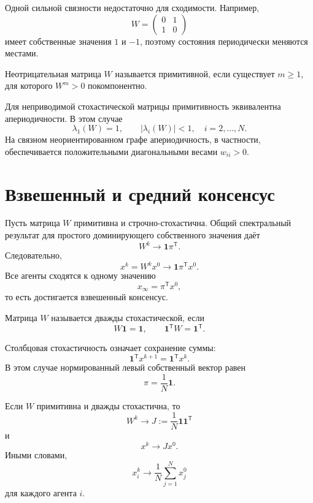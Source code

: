 Одной сильной связности недостаточно для сходимости. Например,
\[
    W=
    \begin{pmatrix}
        0&1\\
        1&0
    \end{pmatrix}
\]
имеет собственные значения \(1\) и \(-1\), поэтому состояния
периодически меняются местами.

\begin{definition}[Примитивность]
Неотрицательная матрица \(W\) называется примитивной, если существует
\(m\ge1\), для которого \(W^m>0\) покомпонентно.
\end{definition}

Для неприводимой стохастической матрицы примитивность эквивалентна
апериодичности. В этом случае
\[
    \lambda_1(W)=1,
    \qquad
    |\lambda_i(W)|<1,
    \quad i=2,\ldots,N.
\]
На связном неориентированном графе апериодичность, в частности,
обеспечивается положительными диагональными весами \(w_{ii}>0\).

\section{Взвешенный и средний консенсус}

Пусть матрица \(W\) примитивна и строчно-стохастична. Общий
спектральный результат для простого доминирующего собственного
значения даёт
\[
    W^k\longrightarrow \mathbf1\pi^{\mathsf T}.
\]
Следовательно,
\[
    x^k=W^kx^0
    \longrightarrow
    \mathbf1\pi^{\mathsf T}x^0.
\]
Все агенты сходятся к одному значению
\[
    x_\infty=\pi^{\mathsf T}x^0,
\]
то есть достигается взвешенный консенсус.

\begin{definition}
Матрица \(W\) называется дважды стохастической, если
\[
    W\mathbf1=\mathbf1,
    \qquad
    \mathbf1^{\mathsf T}W=\mathbf1^{\mathsf T}.
\]
\end{definition}

Столбцовая стохастичность означает сохранение суммы:
\[
    \mathbf1^{\mathsf T}x^{k+1}
    =
    \mathbf1^{\mathsf T}x^k.
\]
В этом случае нормированный левый собственный вектор равен
\[
    \pi=\frac1N\mathbf1.
\]

\begin{theorem}
Если \(W\) примитивна и дважды стохастична, то
\[
    W^k\longrightarrow
    J:=\frac1N\mathbf1\mathbf1^{\mathsf T}
\]
и
\[
    x^k\longrightarrow Jx^0.
\]
Иными словами,
\[
    x_i^k\longrightarrow
    \frac1N\sum_{j=1}^{N}x_j^0
\]
для каждого агента \(i\).
\end{theorem}

